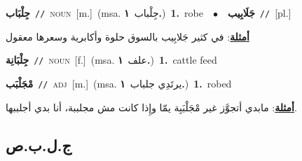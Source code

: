\documentclass[10pt,a4paper,twoside]{article} %
\begin{document}
\begin{multicols}{2}
{\setlength\topsep{0pt}\textbf{\foreignlanguage{arabic}{جِلْبَاب}}\ {\color{gray}\texttt{//}\color{black}}\ \textsc{noun}\ [m.]\ \color{gray}(msa. \foreignlanguage{arabic}{جِلْباب}~\foreignlanguage{arabic}{\textbf{١.}})\color{black}\ \textbf{1.}~robe\ \ $\bullet$\ \ \setlength\topsep{0pt}\textbf{\foreignlanguage{arabic}{جَلَابِيب}}\ {\color{gray}\texttt{//}\color{black}}\ [pl.]\  \begin{flushright}\color{gray}\foreignlanguage{arabic}{\textbf{\underline{\foreignlanguage{arabic}{أمثلة}}}: في كثير جَلابِيب بالسوق حلوة وأكابرية وسعرها معقول}\end{flushright}\color{black}} \vspace{2mm}

{\setlength\topsep{0pt}\textbf{\foreignlanguage{arabic}{جِلْبَانِة}}\ {\color{gray}\texttt{//}\color{black}}\ \textsc{noun}\ [f.]\ \color{gray}(msa. \foreignlanguage{arabic}{علف}~\foreignlanguage{arabic}{\textbf{١.}})\color{black}\ \textbf{1.}~cattle feed\ } \vspace{2mm}

{\setlength\topsep{0pt}\textbf{\foreignlanguage{arabic}{مْجَلْبَب}}\ {\color{gray}\texttt{//}\color{black}}\ \textsc{adj}\ [m.]\ \color{gray}(msa. \foreignlanguage{arabic}{يرتَدِي جلباب}~\foreignlanguage{arabic}{\textbf{١.}})\color{black}\ \textbf{1.}~robed\  \begin{flushright}\color{gray}\foreignlanguage{arabic}{\textbf{\underline{\foreignlanguage{arabic}{أمثلة}}}: مابدي أتجوَّز غير مْجَلْبَبِة يمّا وإِذا كانت مش مجلببة، أنا بدي أجلببها.}\end{flushright}\color{black}} \vspace{2mm}

\vspace{-3mm}
\subsection*{\color{blue}\foreignlanguage{arabic}{ج.ل.ب.ص}\color{blue}{}} 


\end{multicols}
\end{document}
